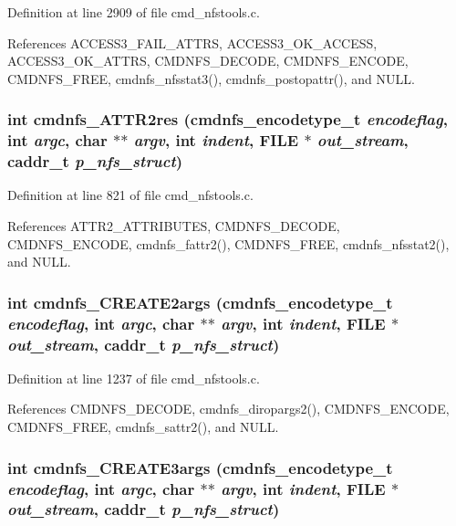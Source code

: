 Definition at line 2909 of file cmd\_\-nfstools.c.

References ACCESS3\_\-FAIL\_\-ATTRS, ACCESS3\_\-OK\_\-ACCESS, ACCESS3\_\-OK\_\-ATTRS, CMDNFS\_\-DECODE, CMDNFS\_\-ENCODE, CMDNFS\_\-FREE, cmdnfs\_\-nfsstat3(), cmdnfs\_\-postopattr(), and NULL.
\subsubsection{\setlength{\rightskip}{0pt plus 5cm}int cmdnfs\_\-ATTR2res ({\bf cmdnfs\_\-encodetype\_\-t} {\em encodeflag}, int {\em argc}, char $\ast$$\ast$ {\em argv}, int {\em indent}, FILE $\ast$ {\em out\_\-stream}, caddr\_\-t {\em p\_\-nfs\_\-struct})}\label{cmd__nfstools_8c_a70}




Definition at line 821 of file cmd\_\-nfstools.c.

References ATTR2\_\-ATTRIBUTES, CMDNFS\_\-DECODE, CMDNFS\_\-ENCODE, cmdnfs\_\-fattr2(), CMDNFS\_\-FREE, cmdnfs\_\-nfsstat2(), and NULL.
\subsubsection{\setlength{\rightskip}{0pt plus 5cm}int cmdnfs\_\-CREATE2args ({\bf cmdnfs\_\-encodetype\_\-t} {\em encodeflag}, int {\em argc}, char $\ast$$\ast$ {\em argv}, int {\em indent}, FILE $\ast$ {\em out\_\-stream}, caddr\_\-t {\em p\_\-nfs\_\-struct})}\label{cmd__nfstools_8c_a75}




Definition at line 1237 of file cmd\_\-nfstools.c.

References CMDNFS\_\-DECODE, cmdnfs\_\-diropargs2(), CMDNFS\_\-ENCODE, CMDNFS\_\-FREE, cmdnfs\_\-sattr2(), and NULL.
\subsubsection{\setlength{\rightskip}{0pt plus 5cm}int cmdnfs\_\-CREATE3args ({\bf cmdnfs\_\-encodetype\_\-t} {\em encodeflag}, int {\em argc}, char $\ast$$\ast$ {\em argv}, int {\em indent}, FILE $\ast$ {\em out\_\-stream}, caddr\_\-t {\em p\_\-nfs\_\-struct})}\label{cmd__nfstools_8c_a100}




